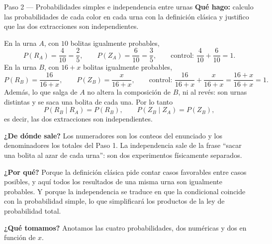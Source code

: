 \documentclass[11pt]{article}
\begin{document}
\begin{paso}{Paso 2 --- Probabilidades simples e independencia entre urnas}
\textbf{Qué hago:} calculo las probabilidades de cada color en cada urna con la definición clásica y justifico que las dos extracciones son independientes.

En la urna $A$, con $10$ bolitas igualmente probables,
\[
P(R_A)=\frac{4}{10}=\frac{2}{5},
\qquad
P(Z_A)=\frac{6}{10}=\frac{3}{5},
\qquad\text{control: }\frac{4}{10}+\frac{6}{10}=1 .
\]
En la urna $B$, con $16+x$ bolitas igualmente probables,
\[
P(R_B)=\frac{16}{16+x},
\qquad
P(Z_B)=\frac{x}{16+x},
\qquad\text{control: }\frac{16}{16+x}+\frac{x}{16+x}=\frac{16+x}{16+x}=1 .
\]
Además, lo que salga de $A$ no altera la composición de $B$, ni al revés: son urnas distintas y se saca una bolita de cada una. Por lo tanto
\[
P(R_B\mid R_A)=P(R_B),\qquad P(Z_B\mid Z_A)=P(Z_B),
\]
es decir, las dos extracciones son independientes.

\textbf{¿De dónde sale?} Los numeradores son los conteos del enunciado y los denominadores los totales del Paso 1. La independencia sale de la frase ``sacar una bolita al azar de cada urna'': son dos experimentos físicamente separados.

\textbf{¿Por qué?} Porque la definición clásica pide contar casos favorables entre casos posibles, y aquí todos los resultados de una misma urna son igualmente probables. Y porque la independencia se traduce en que la condicional coincide con la probabilidad simple, lo que simplificará los productos de la ley de probabilidad total.

\textbf{¿Qué tomamos?} Anotamos las cuatro probabilidades, dos numéricas y dos en función de $x$.
\end{paso}
\end{document}
